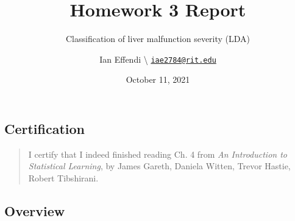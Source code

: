 \documentclass[
  11pt,
  a4paper,
]{scrartcl}
\title{Homework 3 Report}
\subtitle{Classification of liver malfunction severity (LDA)}
\author{Ian Effendi \textbackslash{}
\href{mailto:iae2784@rit.edu}{\nolinkurl{iae2784@rit.edu}}}
\date{October 11, 2021}
\begin{document}
\maketitle

{
\hypersetup{linkcolor=blue}
\setcounter{tocdepth}{3}
\tableofcontents
}
\hypertarget{certification}{%
\subsection{Certification}\label{certification}}

\begin{quote}
I certify that I indeed finished reading Ch. 4 from \emph{An
Introduction to Statistical Learning}, by James Gareth, Daniela Witten,
Trevor Hastie, Robert Tibshirani.
\end{quote}

\hypertarget{overview}{%
\subsection{Overview}\label{overview}}
\end{document}
